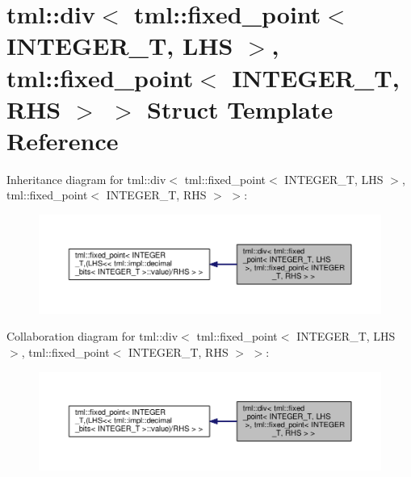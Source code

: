 \hypertarget{structtml_1_1div_3_01tml_1_1fixed__point_3_01_i_n_t_e_g_e_r___t_00_01_l_h_s_01_4_00_01tml_1_1fix088eb2543144f494af69277065360e6c}{\section{tml\+:\+:div$<$ tml\+:\+:fixed\+\_\+point$<$ I\+N\+T\+E\+G\+E\+R\+\_\+\+T, L\+H\+S $>$, tml\+:\+:fixed\+\_\+point$<$ I\+N\+T\+E\+G\+E\+R\+\_\+\+T, R\+H\+S $>$ $>$ Struct Template Reference}
\label{structtml_1_1div_3_01tml_1_1fixed__point_3_01_i_n_t_e_g_e_r___t_00_01_l_h_s_01_4_00_01tml_1_1fix088eb2543144f494af69277065360e6c}
}


Inheritance diagram for tml\+:\+:div$<$ tml\+:\+:fixed\+\_\+point$<$ I\+N\+T\+E\+G\+E\+R\+\_\+\+T, L\+H\+S $>$, tml\+:\+:fixed\+\_\+point$<$ I\+N\+T\+E\+G\+E\+R\+\_\+\+T, R\+H\+S $>$ $>$\+:
\nopagebreak
\begin{figure}[H]
\begin{center}
\leavevmode
\includegraphics[width=350pt]{structtml_1_1div_3_01tml_1_1fixed__point_3_01_i_n_t_e_g_e_r___t_00_01_l_h_s_01_4_00_01tml_1_1fix7b6f349c039db02d44814b995babe304}
\end{center}
\end{figure}


Collaboration diagram for tml\+:\+:div$<$ tml\+:\+:fixed\+\_\+point$<$ I\+N\+T\+E\+G\+E\+R\+\_\+\+T, L\+H\+S $>$, tml\+:\+:fixed\+\_\+point$<$ I\+N\+T\+E\+G\+E\+R\+\_\+\+T, R\+H\+S $>$ $>$\+:
\nopagebreak
\begin{figure}[H]
\begin{center}
\leavevmode
\includegraphics[width=350pt]{structtml_1_1div_3_01tml_1_1fixed__point_3_01_i_n_t_e_g_e_r___t_00_01_l_h_s_01_4_00_01tml_1_1fix25b69f1b5f32236a40db255e483d192c}
\end{center}
\end{figure}
